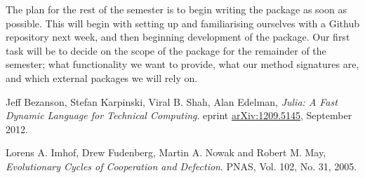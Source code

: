 \documentclass[a4paper,11pt]{article}
\begin{document}
The plan for the rest of the semester is to begin writing the package as soon as possible.
This will begin with setting up and familiarising ourselves with a Github repository next week, and then beginning development of the package.
Our first task will be to decide on the scope of the package for the remainder of the semester; what functionality we want to provide, what our method signatures are, and which external packages we will rely on.

\begin{thebibliography}{9}

        Jeff Bezanson, Stefan Karpinski, Viral B. Shah, Alan Edelman,
        \emph{Julia: A Fast Dynamic Language for Technical Computing}.
        eprint \href{http://arxiv.org/pdf/1209.5145v1.pdf}{arXiv:1209.5145},
        September 2012.

        Lorens A. Imhof, Drew Fudenberg, Martin A. Nowak and Robert M. May,
        \emph{Evolutionary Cycles of Cooperation and Defection}.
        PNAS,
        Vol. 102,
        No. 31, 
        2005.

\end{thebibliography}
\end{document}
